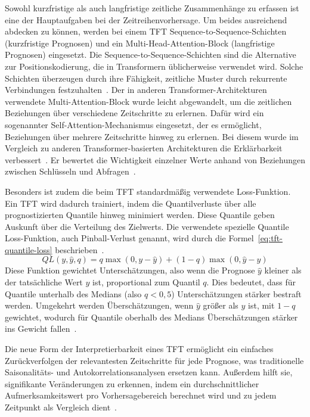 Sowohl kurzfristige als auch langfristige zeitliche Zusammenhänge zu erfassen ist eine der Hauptaufgaben bei der Zeitreihenvorhersage.
Um beides ausreichend abdecken zu können, werden bei einem \ac{TFT} Sequence-to-Sequence-Schichten (kurzfristige Prognosen) und ein Multi-Head-Attention-Block (langfristige Prognosen) eingesetzt.
Die Sequence-to-Sequence-Schichten sind die Alternative zur Positionskodierung, die in Transformern üblicherweise verwendet wird.
Solche Schichten überzeugen durch ihre Fähigkeit, zeitliche Muster durch rekurrente Verbindungen festzuhalten~\cite{Labiadh.2023}.
Der in anderen Transformer-Architekturen verwendete Multi-Attention-Block wurde leicht abgewandelt, um die zeitlichen Beziehungen über verschiedene Zeitschritte zu erlernen.
Dafür wird ein sogenannter Self-Attention-Mechanismus eingesetzt, der es ermöglicht, Beziehungen über mehrere Zeitschritte hinweg zu erlernen.
Bei diesem wurde im Vergleich zu anderen Transformer-basierten Architekturen die Erklärbarkeit verbessert~\cite{Lim.19.12.2019}.
Er bewertet die Wichtigkeit einzelner Werte anhand von Beziehungen zwischen Schlüsseln und Abfragen~\cite{Labiadh.2023}.

Besonders ist zudem die beim \ac{TFT} standardmäßig verwendete Loss-Funktion.
Ein \ac{TFT} wird dadurch trainiert, indem die Quantilverluste über alle prognostizierten Quantile hinweg minimiert werden.
Diese Quantile geben Auskunft über die Verteilung des Zielwerts.
Die verwendete spezielle Quantile Loss-Funktion, auch Pinball-Verlust genannt, wird durch die Formel~\ref{eq:tft-quantile-loss} beschrieben~\cite{Labiadh.2023}.
\begin{equation}
 \label{eq:tft-quantile-loss}
 QL(y, \hat{y}, q) = q \max(0, y - \hat{y}) + (1 - q) \max(0, \hat{y} - y)
\end{equation}
Diese Funktion gewichtet Unterschätzungen, also wenn die Prognose $\hat{y}$ kleiner als der tatsächliche Wert $y$ ist, proportional zum Quantil $q$.
Dies bedeutet, dass für Quantile unterhalb des Medians (also $q < 0,5$) Unterschätzungen stärker bestraft werden.
Umgekehrt werden Überschätzungen, wenn $\hat{y}$ größer als $y$ ist, mit $1 - q$ gewichtet, wodurch für Quantile oberhalb des Medians Überschätzungen stärker ins Gewicht fallen~\cite{Efimov.29.10.2023}.

Die neue Form der Interpretierbarkeit eines \ac{TFT} ermöglicht ein einfaches Zurückverfolgen der relevantesten Zeitschritte für jede Prognose, was traditionelle Saisonalitäts- und Autokorrelationsanalysen ersetzen kann.
Außerdem hilft sie, signifikante Veränderungen zu erkennen, indem ein durchschnittlicher Aufmerksamkeitswert pro Vorhersagebereich berechnet wird und zu jedem Zeitpunkt als Vergleich dient~\cite{Labiadh.2023}.

